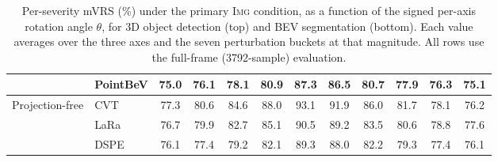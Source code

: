 \begin{table}[t]
\begin{tabular}{ll cccccccccc}
 & PointBeV & 75.0 & 76.1 & 78.1 & 80.9 & 87.3 & 86.5 & 80.7 & 77.9 & 76.3 & 75.1\\
\midrule
\multirow{3}{*}{Projection-free} & CVT & 77.3 & 80.6 & 84.6 & 88.0 & 93.1 & 91.9 & 86.0 & 81.7 & 78.1 & 76.2\\
 & LaRa & 76.7 & 79.9 & 82.7 & 85.1 & 90.5 & 89.2 & 83.5 & 80.6 & 78.8 & 77.6\\
 & DSPE & 76.1 & 77.4 & 79.2 & 82.1 & 89.3 & 88.0 & 82.2 & 79.3 & 77.4 & 76.1\\
\bottomrule
\end{tabular}
\caption{Per-severity mVRS (\%) under the primary \textsc{Img} condition, as a function of the signed per-axis rotation angle $\theta$, for 3D object detection (top) and BEV segmentation (bottom). Each value averages over the three axes and the seven perturbation buckets at that magnitude. All rows use the full-frame (3792-sample) evaluation.}
\label{tab:supp_severity}
\end{table}
